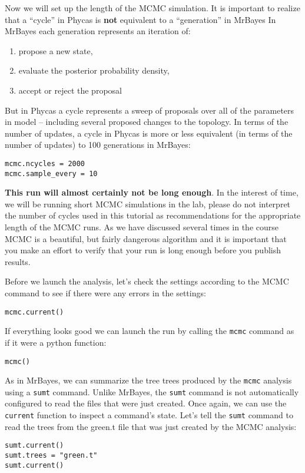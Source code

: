 \documentclass{article}
\newcommand{\cmd}[1]{\texttt{#1}\xspace}
\newcommand{\mb}{MrBayes\xspace}
\newcommand{\phycas}{Phycas\xspace}
\newcommand{\localfile}[1]{\textsf{#1}\xspace}
\begin{document}
Now we will set up the length of the MCMC simulation. 
It is important to realize that a ``cycle'' in \phycas is {\bf not}
equivalent to a ``generation'' in \mb \citet{RonquistH2003}
In \mb each generation represents an iteration of:
\begin{enumerate}
	\item propose a new state,
	\item evaluate the posterior probability density,
	\item accept or reject the proposal
\end{enumerate}
But in \phycas a cycle represents a sweep of proposals over all of the parameters
in model -- including several proposed changes to the topology.
In terms of the number of updates, a cycle in \phycas is more or less equivalent (in terms 
of the number of updates) to 100 generations in \mb:
\begin{verbatim}
mcmc.ncycles = 2000
mcmc.sample_every = 10
\end{verbatim}
{\bf This run will almost certainly not be long enough}.
In the interest of time, we will be running short MCMC simulations in the lab, please do
not interpret the number of cycles used in this tutorial 
as recommendations for the appropriate length of the MCMC runs.
As we have discussed several times in the course MCMC is a beautiful, but
fairly dangerous algorithm and it is important that you make an 
effort to verify that your run is long enough before you publish
results.


Before we launch the analysis, let's check the settings according to the MCMC command
to see if there were any errors in the settings:
\begin{verbatim}
mcmc.current()
\end{verbatim}

If everything looks good we can launch the run by calling the \cmd{mcmc} command
as if it were a python function:
\begin{verbatim}
mcmc()
\end{verbatim}

As in \mb, we can summarize the tree trees produced by the \cmd{mcmc} analysis
using a \cmd{sumt} command.
Unlike \mb, the \cmd{sumt} command is not automatically configured to read the files
that were just created.
Once again, we can use the \cmd{current} function to inspect a command's state.
Let's tell the \cmd{sumt} command to read the trees from the \localfile{green.t} file
that was just created by the MCMC analysis:
\begin{verbatim}
sumt.current()
sumt.trees = "green.t"
sumt.current()
\end{verbatim}
\end{document}

